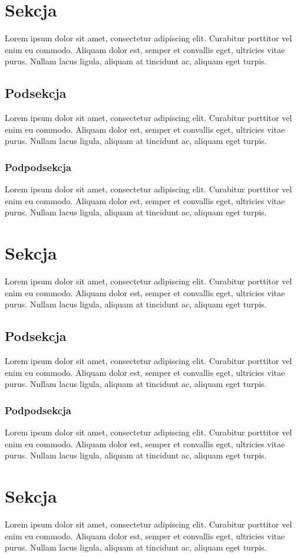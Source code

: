 \documentclass[10pt,a4paper]{article}
\begin{document}
\section{Sekcja}
Lorem ipsum dolor sit amet, consectetur adipiscing elit. Curabitur porttitor vel enim eu commodo. Aliquam dolor est, semper et convallis eget, ultricies vitae purus. Nullam lacus ligula, aliquam at tincidunt ac, aliquam eget turpis.
\subsection{Podsekcja}
Lorem ipsum dolor sit amet, consectetur adipiscing elit. Curabitur porttitor vel enim eu commodo. Aliquam dolor est, semper et convallis eget, ultricies vitae purus. Nullam lacus ligula, aliquam at tincidunt ac, aliquam eget turpis.
\subsubsection{Podpodsekcja}
Lorem ipsum dolor sit amet, consectetur adipiscing elit. Curabitur porttitor vel enim eu commodo. Aliquam dolor est, semper et convallis eget, ultricies vitae purus. Nullam lacus ligula, aliquam at tincidunt ac, aliquam eget turpis.
\newpage
\section{Sekcja}
Lorem ipsum dolor sit amet, consectetur adipiscing elit. Curabitur porttitor vel enim eu commodo. Aliquam dolor est, semper et convallis eget, ultricies vitae purus. Nullam lacus ligula, aliquam at tincidunt ac, aliquam eget turpis.
\subsection{Podsekcja}
Lorem ipsum dolor sit amet, consectetur adipiscing elit. Curabitur porttitor vel enim eu commodo. Aliquam dolor est, semper et convallis eget, ultricies vitae purus. Nullam lacus ligula, aliquam at tincidunt ac, aliquam eget turpis.
\subsubsection{Podpodsekcja}
Lorem ipsum dolor sit amet, consectetur adipiscing elit. Curabitur porttitor vel enim eu commodo. Aliquam dolor est, semper et convallis eget, ultricies vitae purus. Nullam lacus ligula, aliquam at tincidunt ac, aliquam eget turpis.
\newpage
\section{Sekcja}
Lorem ipsum dolor sit amet, consectetur adipiscing elit. Curabitur porttitor vel enim eu commodo. Aliquam dolor est, semper et convallis eget, ultricies vitae purus. Nullam lacus ligula, aliquam at tincidunt ac, aliquam eget turpis.
\end{document}
